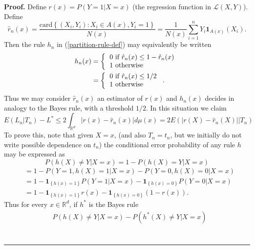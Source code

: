 \documentclass[11pt,twoside]{article}%
\theoremstyle{change}
\newenvironment{proof}[1][Proof]{\textbf{#1.} }{\ \rule{0.5em}{0.5em}}
\begin{document}
\begin{proof}
Define $r(x)=P\left(  Y=1|X=x\right)  $ (the regression function in
$\mathcal{L}(X,Y)$). Define
\[
\hat{r}_{n}(x)=\frac{\mathrm{card}\left\{  (X_{i},Y_{i}):X_{i}\in
A(x),Y_{i}=1\right\}  }{N(x)}=\frac{1}{N(x)}%
{\displaystyle\sum\limits_{i=1}^{n}}
Y_{i}\mathbf{1}_{A(x)}(X_{i}).
\]
Then the rule $h_{n}$ in (\ref{partition-rule-def}) may equivalently be
written
\begin{align}
h_{n}(x)  & =\left\{
\begin{tabular}
[c]{l}%
$0$ if $\hat{r}_{n}(x)\leq1-\hat{r}_{n}(x)$\\
$1$ otherwise
\end{tabular}
\right. \nonumber\\
& =\left\{
\begin{tabular}
[c]{l}%
$0$ if $\hat{r}_{n}(x)\leq1/2$\\
$1$ otherwise
\end{tabular}
\right.  .\label{using-form-2}%
\end{align}
Thus we may consider $\hat{r}_{n}(x)$ an estimator of $r(x)$ and $h_{n}(x)$
decides in analogy to the Bayes rule, with a threshold $1/2$. In this
situation we claim
\begin{equation}
E\left(  L_{n}|T_{n}\right)  -L^{\ast}\leq2\int_{\mathbb{R}^{d}}\left\vert
r(x)-\hat{r}_{n}(x)\right\vert d\mu(x)=2E\left(  \left\vert r(X)-\hat{r}%
_{n}(X)\right\vert |T_{n}\right) \label{claim-risk-plugin}%
\end{equation}
To prove this, note that given $X=x$, (and also $T_{n}=t_{n}$, but we
initially do not write possible dependence on $t_{n}$) the conditional error
probability of any rule $h$ may be expressed as
\[
P\left(  h(X)\neq Y|X=x\right)  =1-P\left(  h(X)=Y|X=x\right)
\]%
\begin{align*}
& =1-P\left(  Y=1,h(X)=1|X=x\right)  -P\left(  Y=0,h(X)=0|X=x\right) \\
& =1-\mathbf{1}_{\left\{  h(x)=1\right\}  }P\left(  Y=1|X=x\right)
-\mathbf{1}_{\left\{  h(x)=0\right\}  }P\left(  Y=0|X=x\right) \\
& =1-\mathbf{1}_{\left\{  h(x)=1\right\}  }r(x)-\mathbf{1}_{\left\{
h(x)=0\right\}  }\left(  1-r(x)\right)  .
\end{align*}
Thus for every $x\in\mathbb{R}^{d}$, if $h^{\ast}$ is the Bayes rule%
\begin{align*}
& P\left(  h(X)\neq Y|X=x\right)  -P\left(  h^{\ast}(X)\neq Y|X=x\right) \\

\end{align*}
\end{proof}
\end{document}
